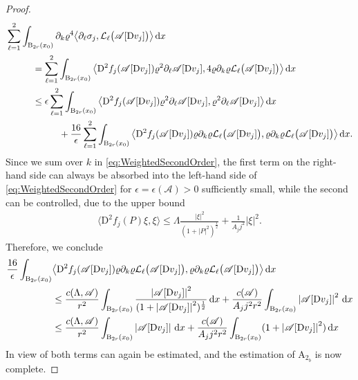 \documentclass[a4paper,10pt,reqno,oneside]{amsart}
\numberwithin{equation}{section}
\newcommand{\ball}{\mathrm{B}}
\newcommand{\A}{\mathscr{A}}
\newcommand{\D}{\mathrm{D}}
\newcommand{\dx}[1]{\,\mathrm{d}#1}
\newcommand{\skalarProd}[2]{\big\langle#1,#2\big\rangle}
\newcommand{\abs}[1]{\left\lvert#1\right\rvert}
\begin{document}
\begin{proof}
\pagebreak
\begin{align*}
  &\sum_{\ell=1}^2\int_{\ball_{2r}(x_0)}\partial_k\varrho^4\skalarProd{\partial_\ell\sigma_j}{\mathcal{L}_{\ell}\big(\A[\D v_j]\big)}\dx{x} \\
  &\hspace{1cm}= \sum_{\ell=1}^2 \int_{\ball_{2r}(x_0)}\skalarProd{\D^2f_j(\A[\D v_j])\varrho^2\partial_\ell\A[\D v_j]}{4\varrho\partial_k\varrho\mathcal{L}_{\ell}\big(\A[\D v_j]\big)}\dx{x}\notag \\
  &\hspace{1cm}\le \epsilon\sum_{\ell=1}^2 \int_{\ball_{2r}(x_0)}\skalarProd{\D^2f_j(\A[\D v_j])\varrho^2\partial_\ell\A[\D v_j]}{\varrho^2\partial_\ell\A[\D v_j]}\dx{x}\\
  &\hspace{2cm}+\frac{16}{\epsilon}\sum_{\ell=1}^2 \int_{\ball_{2r}(x_0)}\skalarProd{\D^2f_j(\A[\D v_j])\varrho\partial_k\varrho\mathcal{L}_{\ell}\big(\A[\D v_j]\big)}{\varrho\partial_k\varrho\mathcal{L}_{\ell}\big(\A[\D v_j]\big)}\dx{x}. \notag
\end{align*}
Since we sum over $k$ in \eqref{eq:WeightedSecondOrder}, the first term on the right-hand side can always be absorbed into the left-hand side of \eqref{eq:WeightedSecondOrder} for $\epsilon=\epsilon(\A)>0$ sufficiently small,  while the second can be controlled, due to the upper bound
	\begin{align*}
	\skalarProd{\D^2 f_j (P)\xi}{\xi} \leq \Lambda \frac{\abs{\xi}^2}{(1+\abs{P}^2)^{\frac{1}{2}}} + \frac{1}{A_j j^2}\abs{\xi}^2.
	\end{align*}	
	Therefore, we conclude 
\begin{align}
 \frac{16}{\epsilon}\int_{\ball_{2r}(x_0)}&\skalarProd{\D^2f_j(\A[\D v_j])\varrho\partial_k\varrho\mathcal{L}_{\ell}\big(\A[\D v_j]\big)}{\varrho\partial_k\varrho\mathcal{L}_{\ell}\big(\A[\D v_j]\big)}\dx{x} \notag\\
 &\le \frac{c(\Lambda,\A)}{r^2}\int_{\ball_{2r}(x_0)}\frac{\abs{\A[\D v_j]}^2}{(1+\abs{\A[\D v_j]}^2)^{\frac12}}\dx{x}+\frac{c(\A)}{A_jj^2r^2}\int_{\ball_{2r}(x_0)}\abs{\A[\D v_j]}^2\dx{x} \notag\\
 &\le \frac{c(\Lambda,\A)}{r^2}\int_{\ball_{2r}(x_0)}\abs{\A[\D v_j]}\dx{x}+\frac{c(\A)}{A_jj^2r^2}\int_{\ball_{2r}(x_0)}(1+\abs{\A[\D v_j]}^2)\dx{x}
\end{align}
In view of  both terms can again be estimated, and the estimation of $\mathrm{A}_{2_{b}}$ is now complete.


\end{proof}
\end{document}
